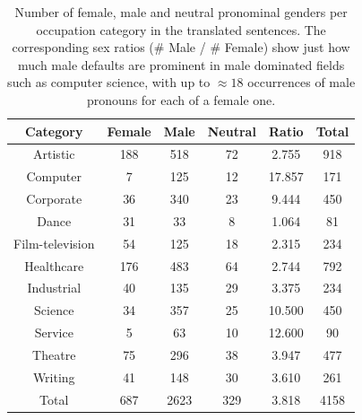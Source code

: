 \documentclass{article}
\begin{document}
\begin{table}[H]
	\centering
	\begin{tabular}{|c|c|c|c|c|c|}
	\hline
	Category & Female & Male & Neutral & Ratio & Total \\ \hline
	\hline
	Artistic        & 188 & 518 & 72 & 2.755 	& 918 \\ \hline
	Computer        & 7   & 125 & 12 & 17.857 	& 171 \\ \hline
	Corporate       & 36  & 340 & 23 & 9.444 	& 450 \\ \hline
	Dance           & 31  & 33  & 8  & 1.064 	& 81  \\ \hline
	Film-television & 54  & 125 & 18 & 2.315 	& 234 \\ \hline
	Healthcare      & 176 & 483 & 64 & 2.744 	& 792 \\ \hline
	Industrial      & 40  & 135 & 29 & 3.375   	& 234 \\ \hline
	Science         & 34  & 357 & 25 & 10.500	& 450 \\ \hline
	Service         & 5   & 63  & 10 & 12.600	& 90  \\ \hline
	Theatre         & 75  & 296 & 38 & 3.947 	& 477 \\ \hline
	Writing         & 41  & 148 & 30 & 3.610 	& 261 \\ \hline
	\hline
	Total           & 687 & 2623 & 329 & 3.818 & 4158 \\ \hline
	\end{tabular}
	\label{tab:gender-by-category}
	\caption{Number of female, male and neutral pronominal genders per occupation category in the translated sentences. The corresponding sex ratios (\# Male / \# Female) show just how much male defaults are prominent in male dominated fields such as computer science, with up to $\approx 18$ occurrences of male pronouns for each of a female one.}
\end{table}
\end{document}
